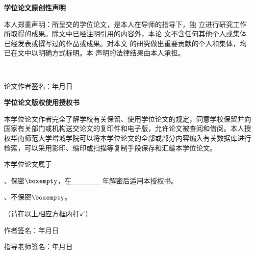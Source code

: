 \thispagestyle{empty}
\begin{center}
  \bfseries 学位论文原创性声明
\end{center}
\thispagestyle{plain}
\begin{spacing}{1.5}
  本⼈郑重声明：所呈交的学位论⽂，是本⼈在导师的指导下，独 ⽴进⾏研究⼯作所取得的成果。除⽂中已经注明引⽤的内容外，本论 ⽂不含任何其他个⼈或集体已经发表或撰写过的作品或成果。对本⽂ 的研究做出重要贡献的个⼈和集体，均已在⽂中以明确⽅式标明。本 声明的法律结果由本⼈承担。
  \begin{center}
    \ \\
    \end{center}
    \hfill \hfill 论文作者签名：\hspace{3pc}年\hspace{1pc}月\hspace{1pc}日
\end{spacing}

\thispagestyle{plain}

\begin{center}
   \bfseries 学位论文版权使用授权书
\end{center}
\thispagestyle{plain}
\begin{spacing}{1.5}
  本学位论文作者完全了解学校有关保留、使用学位论文的规定，同意学校保留并向国家有关部门或机构送交论文的复印件和电子版，允许论文被查阅和借阅。本人授权华南师范大学增城学院可以将本学位论文的全部或部分内容编入有关数据库进行检索，可以采用影印、缩印或扫描等复制手段保存和汇编本学位论文。 

  本学位论文属于

  \indent{}、保密$\boxempty$，在\_\_\_\_\_\_年解密后适用本授权书。

  \indent{}、不保密$\boxempty$。

  \indent\indent （请在以上相应方框内打$\checkmark$）

  \hfill \hfill 作者签名：\hspace{3pc}年\hspace{1pc}月\hspace{1pc}日
  
  \hfill \hfill 指导老师签名：\hspace{3pc}年\hspace{1pc}月\hspace{1pc}日

\end{spacing}

\afterpage{\blankpage}
\newpage